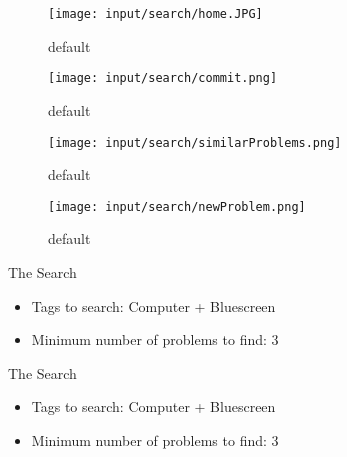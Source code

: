 \begin{frame}
\begin{figure}[htbp]
\begin{center}
\texttt{[image: input/search/home.JPG]}
\caption{default}
\label{default}
\end{center}
\end{figure}

\end{frame}

\begin{frame}

\begin{figure}[htbp]
\begin{center}
\texttt{[image: input/search/commit.png]}
\caption{default}
\label{default}
\end{center}
\end{figure}

\end{frame}

\begin{frame}

\begin{figure}[htbp]
\begin{center}
\texttt{[image: input/search/similarProblems.png]}
\caption{default}
\label{default}
\end{center}
\end{figure}

\end{frame}

\begin{frame}

\begin{figure}[htbp]
\begin{center}
\texttt{[image: input/search/newProblem.png]}
\caption{default}
\label{default}
\end{center}
\end{figure}

\end{frame}

\begin{frame}{The Search}
\begin{itemize}
\item Tags to search: Computer + Bluescreen
\item Minimum number of problems to find: 3
\end{itemize}

\end{frame}



\begin{frame}{The Search}
\begin{itemize}
\item Tags to search: Computer + Bluescreen
\item Minimum number of problems to find: 3
\end{itemize}

\end{frame}


